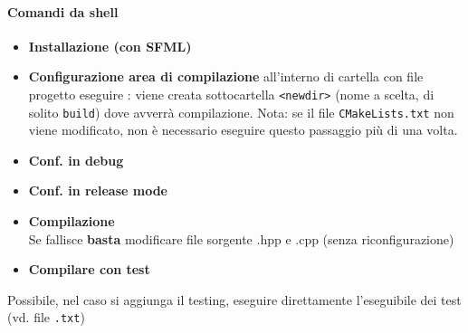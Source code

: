 \documentclass[10pt, oneside]{Book}
\begin{document}
\paragraph{Comandi da shell}
\begin{itemize}
\item \textbf{Installazione (con SFML)} 

\item \textbf{Configurazione area di compilazione} all'interno di cartella con file progetto eseguire  : viene creata sottocartella \texttt{<newdir>} (nome a scelta, di solito \texttt{build}) dove avverrà compilazione. Nota: se il file \texttt{CMakeLists.txt} non viene modificato, non è necessario eseguire questo passaggio più di una volta.

\item \textbf{Conf. in debug} 

\item \textbf{Conf. in release mode}  

\item \textbf{Compilazione}  
\\Se fallisce \textbf{basta} modificare file sorgente .hpp e .cpp (senza riconfigurazione)

\item \textbf{Compilare con test} 
\end{itemize}

Possibile, nel caso si aggiunga il testing, eseguire direttamente l'eseguibile dei test (vd. file \texttt{.txt})
\end{document}
